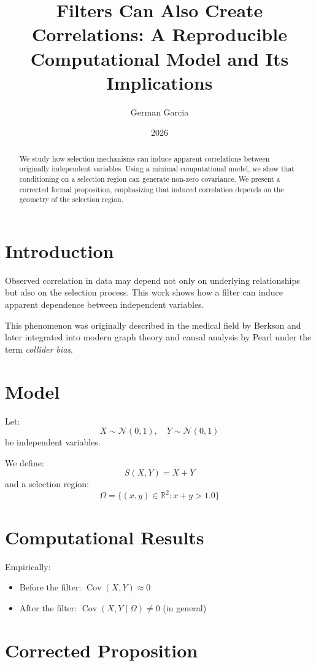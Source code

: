 \documentclass[11pt]{article}
\title{Filters Can Also Create Correlations: A Reproducible Computational Model and Its Implications}
\author{German Garcia}
\date{2026}
\DeclareMathOperator{\Cov}{Cov}
\begin{document}
\maketitle

\begin{abstract}
We study how selection mechanisms can induce apparent correlations between originally independent variables. Using a minimal computational model, we show that conditioning on a selection region can generate non-zero covariance. We present a corrected formal proposition, emphasizing that induced correlation depends on the geometry of the selection region.
\end{abstract}

\section{Introduction}

Observed correlation in data may depend not only on underlying relationships but also on the selection process. This work shows how a filter can induce apparent dependence between independent variables. 

This phenomenon was originally described in the medical field by Berkson \cite{berkson1946} and later integrated into modern graph theory and causal analysis by Pearl \cite{pearl2000} under the term \textit{collider bias}.

\section{Model}

Let:
\[
X \sim \mathcal{N}(0,1), \quad Y \sim \mathcal{N}(0,1)
\]
be independent variables.

We define:
\[
S(X,Y) = X + Y
\]
and a selection region:
\[
\Omega = \{(x,y) \in \mathbb{R}^2 : x+y > 1.0\}
\]

\section{Computational Results}

Empirically:
\begin{itemize}
\item Before the filter: $\Cov(X,Y) \approx 0$
\item After the filter: $\Cov(X,Y \mid \Omega) \neq 0$ (in general)
\end{itemize}

\section{Corrected Proposition}
\end{document}

